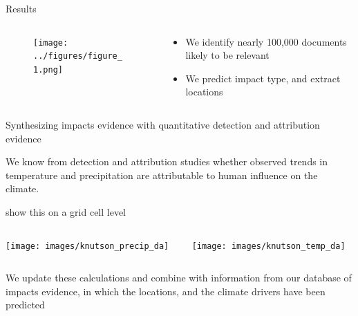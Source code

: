 \documentclass[9pt]{beamer}
\begin{document}
\begin{frame}{Results}

\begin{columns}
	\begin{column}{0.618\linewidth}
		\begin{figure}
			\texttt{[image: ../figures/figure\_1.png]}
		\end{figure}
	\end{column}
	\begin{column}{0.382\linewidth}
		\begin{itemize}
			\item We identify nearly 100,000 documents likely to be relevant
			\item We predict impact type, and extract locations
		\end{itemize}
	
	\end{column}
\end{columns}

\end{frame}



\begin{frame}{Synthesizing impacts evidence with quantitative detection and attribution evidence}

We know from detection and attribution studies whether observed trends in temperature and precipitation are attributable to human influence on the climate.

\cite{Knutson2013, Knutson2018} show this on a grid cell level

\begin{columns}
	\begin{column}{0.65\linewidth}
		\texttt{[image: images/knutson\_precip\_da]}
	\end{column}
	\begin{column}{0.35\linewidth}
		\texttt{[image: images/knutson\_temp\_da]}
	\end{column}
\end{columns}

We update these calculations and combine with information from our database of impacts evidence, in which the locations, and the climate drivers have been predicted

\end{frame}
\end{document}
